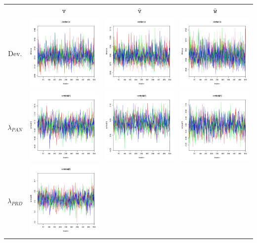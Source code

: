 \documentclass[letter,12pt]{article}
\begin{document}
\begin{table}
\centering
\begin{tabular}{cccc}
                     & $\texttt{v}$ & $\bar{\texttt{v}}$ & $\bar{\texttt{w}}$ \\ 
    Dev.             & \includegraphics[width=.15\columnwidth]{../graphs/traceplots/2003d97v_1.pdf} &
                        \includegraphics[width=.15\columnwidth]{../graphs/traceplots/2003d97vbar_1.pdf} &
                         \includegraphics[width=.15\columnwidth]{../graphs/traceplots/2003d97wbar_1.pdf} \\
    $\lambda_{PAN}$   & \includegraphics[width=.15\columnwidth]{../graphs/traceplots/2003d97v_2.pdf} &
                        \includegraphics[width=.15\columnwidth]{../graphs/traceplots/2003d97vbar_2.pdf} &
                         \includegraphics[width=.15\columnwidth]{../graphs/traceplots/2003d97wbar_2.pdf} \\
    $\lambda_{PRD}$   & \includegraphics[width=.15\columnwidth]{../graphs/traceplots/2003d97v_3.pdf} &

\end{tabular}
\end{table}
\end{document}
